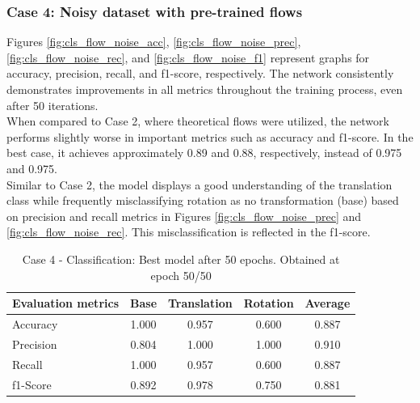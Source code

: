 \subsubsection{Case 4: Noisy dataset with pre-trained flows}

Figures \ref{fig:cls_flow_noise_acc}, \ref{fig:cls_flow_noise_prec}, \ref{fig:cls_flow_noise_rec}, and \ref{fig:cls_flow_noise_f1} represent graphs for accuracy, precision, recall, and f1-score, respectively. The network consistently demonstrates improvements in all metrics throughout the training process, even after 50 iterations.\\

When compared to Case 2, where theoretical flows were utilized, the network performs slightly worse in important metrics such as accuracy and f1-score. In the best case, it achieves approximately 0.89 and 0.88, respectively, instead of 0.975 and 0.975.\\

Similar to Case 2, the model displays a good understanding of the translation class while frequently misclassifying rotation as no transformation (base) based on precision and recall metrics in Figures \ref{fig:cls_flow_noise_prec} and \ref{fig:cls_flow_noise_rec}. This misclassification is reflected in the f1-score.
\begin{table}[H]
        \begin{center}
                \begin{tabular}{|l||c|c|c|c|}
                        \hline 
                        Evaluation metrics & Base & Translation & Rotation & Average \\
                        \hline \hline
                        Accuracy  & 1.000 & 0.957 &  0.600 &  0.887\\
                        \hline
                        Precision & 0.804 &  1.000 &  1.000 &  0.910\\
                        \hline
                        Recall & 1.000&  0.957& 0.600 & 0.887 \\
                        \hline
                        f1-Score &  0.892&  0.978 & 0.750 & 0.881 \\
                        \hline
                \end{tabular}
        \end{center}
        \caption{Case 4 - Classification: Best model after 50 epochs. Obtained at epoch 50/50 }
        \label{tab:cls_res}
\end{table}

